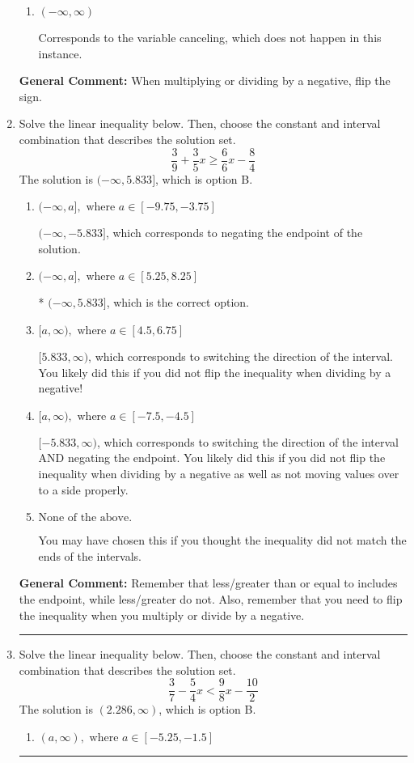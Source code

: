 \documentclass{extbook}[14pt]
\newcommand{\litem}[1]{\item #1

\rule{\textwidth}{0.4pt}}
\begin{document}
\begin{enumerate}
{\begin{enumerate}[label=\Alph*.]
Corresponds to inverting the inequality and negating the solution.
\item \( (-\infty, \infty) \)

Corresponds to the variable canceling, which does not happen in this instance.
\end{enumerate}

\textbf{General Comment:} When multiplying or dividing by a negative, flip the sign.
}
\litem{
Solve the linear inequality below. Then, choose the constant and interval combination that describes the solution set.
\[ \frac{3}{9} + \frac{3}{5} x \geq \frac{6}{6} x - \frac{8}{4} \]The solution is \( (-\infty, 5.833] \), which is option B.\begin{enumerate}[label=\Alph*.]
\item \( (-\infty, a], \text{ where } a \in [-9.75, -3.75] \)

 $(-\infty, -5.833]$, which corresponds to negating the endpoint of the solution.
\item \( (-\infty, a], \text{ where } a \in [5.25, 8.25] \)

* $(-\infty, 5.833]$, which is the correct option.
\item \( [a, \infty), \text{ where } a \in [4.5, 6.75] \)

 $[5.833, \infty)$, which corresponds to switching the direction of the interval. You likely did this if you did not flip the inequality when dividing by a negative!
\item \( [a, \infty), \text{ where } a \in [-7.5, -4.5] \)

 $[-5.833, \infty)$, which corresponds to switching the direction of the interval AND negating the endpoint. You likely did this if you did not flip the inequality when dividing by a negative as well as not moving values over to a side properly.
\item \( \text{None of the above}. \)

You may have chosen this if you thought the inequality did not match the ends of the intervals.
\end{enumerate}

\textbf{General Comment:} Remember that less/greater than or equal to includes the endpoint, while less/greater do not. Also, remember that you need to flip the inequality when you multiply or divide by a negative.
}
\litem{
Solve the linear inequality below. Then, choose the constant and interval combination that describes the solution set.
\[ \frac{3}{7} - \frac{5}{4} x < \frac{9}{8} x - \frac{10}{2} \]The solution is \( (2.286, \infty) \), which is option B.\begin{enumerate}[label=\Alph*.]
\item \( (a, \infty), \text{ where } a \in [-5.25, -1.5] \)


\end{enumerate}}
\end{enumerate}
\end{document}
